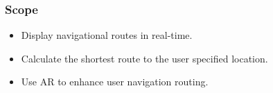 \frametitle{Scope}

\begin{itemize}
	\item Display navigational routes in real-time.
	\item Calculate the shortest route to the user specified location.
	\item Use AR to enhance user navigation routing.
\end{itemize}
